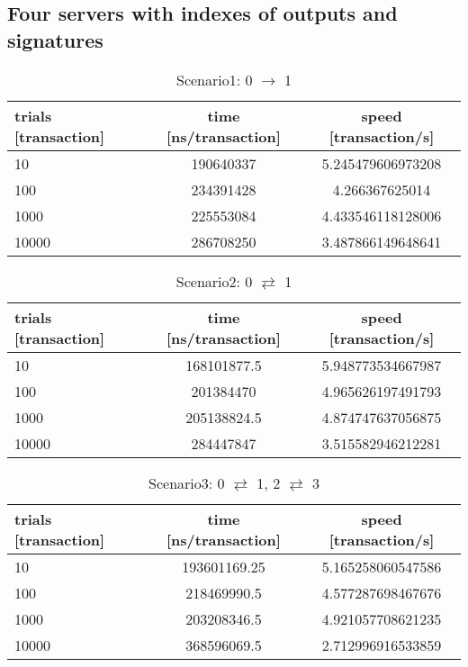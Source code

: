 \documentclass[a4j,11pt,uplatex,onecolumn]{article}
\begin{document}
\subsection{Four servers with indexes of outputs and signatures}
\begin{table}[htb]
  \begin{center}
    \caption{Scenario1: 0 $\rightarrow$ 1}
    \begin{tabular}{|l|c|c|} \hline
        trials [transaction] & time [ns/transaction] & speed [transaction/s]\\ \hline \hline
        10 & 190640337 & 5.245479606973208 \\
        100 & 234391428 & 4.266367625014 \\
        1000 & 225553084 & 4.433546118128006 \\ 
        10000 & 286708250 & 3.487866149648641 \\ \hline
    \end{tabular}
  \end{center}
\end{table}

\begin{table}[htb]
  \begin{center}
    \caption{Scenario2: 0 $\rightleftarrows$ 1}
    \begin{tabular}{|l|c|c|} \hline
        trials [transaction] & time [ns/transaction] & speed [transaction/s]\\ \hline \hline
        10 & 168101877.5 & 5.948773534667987 \\
        100 & 201384470 & 4.965626197491793 \\
        1000 & 205138824.5 & 4.874747637056875 \\
        10000 & 284447847 & 3.515582946212281\\ \hline
    \end{tabular}
  \end{center}
\end{table}

\begin{table}[htb]
  \begin{center}
    \caption{Scenario3: 0 $\rightleftarrows$ 1, 2 $\rightleftarrows$ 3}
    \begin{tabular}{|l|c|c|} \hline
        trials [transaction] & time [ns/transaction] & speed [transaction/s]\\ \hline \hline
        10 & 193601169.25 & 5.165258060547586 \\
        100 & 218469990.5 & 4.577287698467676 \\
        1000 & 203208346.5 & 4.921057708621235 \\
        10000 & 368596069.5 & 2.712996916533859 \\ \hline
    \end{tabular}
  \end{center}
\end{table}
\end{document}
